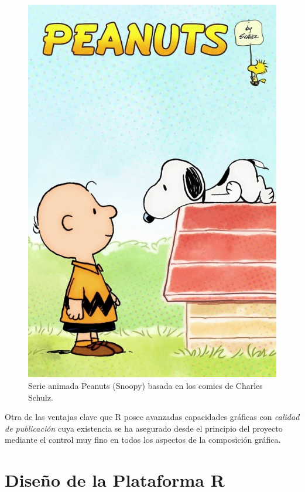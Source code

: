 \documentclass[
]{book}
\begin{document}
\begin{figure}

{\centering \includegraphics[width=7.4in]{img/Peanuts2014} 

}

\caption{Serie animada Peanuts (Snoopy) basada en los comics de Charles Schulz.}\label{fig:img-pea}
\end{figure}

Otra de las ventajas clave que R posee avanzadas capacidades gráficas con \emph{calidad de publicación} cuya existencia se ha asegurado desde el principio del proyecto mediante el control muy fino en todos los aspectos de la composición gráfica.

\hypertarget{dis-plat}{%
\section{Diseño de la Plataforma R}\label{dis-plat}}
\end{document}
